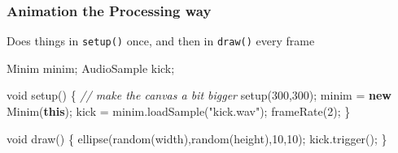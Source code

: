 \documentclass[ignorenonframetext,]{beamer}
\newenvironment{Shaded}{}{}
\newcommand{\KeywordTok}[1]{\textcolor[rgb]{0.00,0.44,0.13}{\textbf{{#1}}}}
\newcommand{\DataTypeTok}[1]{\textcolor[rgb]{0.56,0.13,0.00}{{#1}}}
\newcommand{\DecValTok}[1]{\textcolor[rgb]{0.25,0.63,0.44}{{#1}}}
\newcommand{\StringTok}[1]{\textcolor[rgb]{0.25,0.44,0.63}{{#1}}}
\newcommand{\CommentTok}[1]{\textcolor[rgb]{0.38,0.63,0.69}{\textit{{#1}}}}
\newcommand{\FunctionTok}[1]{\textcolor[rgb]{0.02,0.16,0.49}{{#1}}}
\newcommand{\NormalTok}[1]{{#1}}
\begin{document}
\begin{frame}[fragile]\frametitle{Animation the Processing way}

Does things in \texttt{setup()} once, and then in \texttt{draw()} every
frame

\begin{Shaded}
\begin{Highlighting}[]
\NormalTok{Minim minim;}
\NormalTok{AudioSample kick;}

\DataTypeTok{void} \FunctionTok{setup}\NormalTok{() \{}
  \CommentTok{// make the canvas a bit bigger}
  \FunctionTok{setup}\NormalTok{(}\DecValTok{300}\NormalTok{,}\DecValTok{300}\NormalTok{);}
  \NormalTok{minim = }\KeywordTok{new} \FunctionTok{Minim}\NormalTok{(}\KeywordTok{this}\NormalTok{);}
  \NormalTok{kick = minim.}\FunctionTok{loadSample}\NormalTok{(}\StringTok{"kick.wav"}\NormalTok{);}
  \FunctionTok{frameRate}\NormalTok{(}\DecValTok{2}\NormalTok{);}
\NormalTok{\}}

\DataTypeTok{void} \FunctionTok{draw}\NormalTok{() \{}
  \FunctionTok{ellipse}\NormalTok{(}\FunctionTok{random}\NormalTok{(width),}\FunctionTok{random}\NormalTok{(height),}\DecValTok{10}\NormalTok{,}\DecValTok{10}\NormalTok{);}
  \NormalTok{kick.}\FunctionTok{trigger}\NormalTok{();}
\NormalTok{\}}
\end{Highlighting}
\end{Shaded}

\end{frame}
\end{document}
